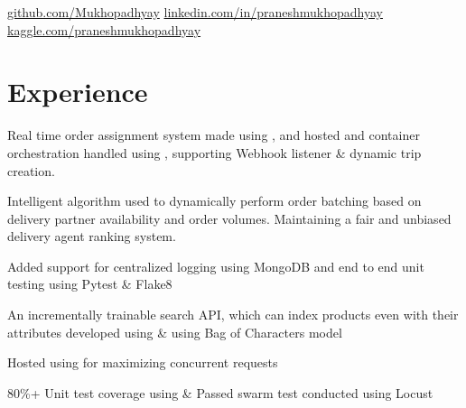 \documentclass[]{deedy-resume-openfont}
\begin{document}
%
%
\lastupdated

%
%


\namesection{Pranesh}{Mukhopadhyay}{
\href{mailto:praneshmukherjee7@gmail.com}{praneshmukherjee7@gmail.com} | 96747-70912
}


\href{https://github.com/Mukhopadhyay}{ github.com/Mukhopadhyay} \; \href{https://www.linkedin.com/in/praneshmukhopadhyay/}{ linkedin.com/in/praneshmukhopadhyay} \; \href{https://www.kaggle.com/praneshmukhopadhyay}{ kaggle.com/praneshmukhopadhyay}



\section{Experience}

\vspace{\topsep} %

\begin{tightemize}
\item Real time order assignment system made using ,  and hosted and container orchestration handled using , supporting Webhook listener \& dynamic trip creation.
\item Intelligent algorithm used to dynamically perform order batching based on delivery partner availability and order volumes. Maintaining a fair and unbiased delivery agent ranking system.
\item Added support for centralized logging using MongoDB and end to end unit testing using Pytest \& Flake8
\end{tightemize}

\begin{tightemize}
\item An incrementally trainable search API, which can index products even with their attributes developed using  \&  using Bag of Characters model
\item Hosted using  for maximizing concurrent requests
\item 80\%+ Unit test coverage using \& Passed swarm test conducted using Locust
\end{tightemize}
\end{document}
